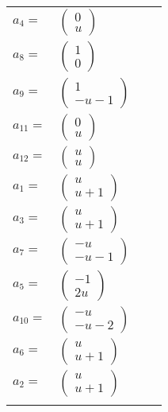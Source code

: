 \documentclass[1p]{elsarticle_modified}
\theoremstyle{definition}
\begin{document}
\begin{tabular}{m{7pt} m{180pt} m{7pt} m{180pt} }
\flushright $a_{4}=$&$\begin{pmatrix}0\\u\end{pmatrix}$ \\
\flushright $a_{8}=$&$\begin{pmatrix}1\\0\end{pmatrix}$ \\
\flushright $a_{9}=$&$\begin{pmatrix}1\\- u-1\end{pmatrix}$ \\
\flushright $a_{11}=$&$\begin{pmatrix}0\\u\end{pmatrix}$ \\
\flushright $a_{12}=$&$\begin{pmatrix}u\\u\end{pmatrix}$ \\
\flushright $a_{1}=$&$\begin{pmatrix}u\\u+1\end{pmatrix}$ \\
\flushright $a_{3}=$&$\begin{pmatrix}u\\u+1\end{pmatrix}$ \\
\flushright $a_{7}=$&$\begin{pmatrix}- u\\- u-1\end{pmatrix}$ \\
\flushright $a_{5}=$&$\begin{pmatrix}-1\\2 u\end{pmatrix}$ \\
\flushright $a_{10}=$&$\begin{pmatrix}- u\\- u-2\end{pmatrix}$ \\
\flushright $a_{6}=$&$\begin{pmatrix}u\\u+1\end{pmatrix}$ \\
\flushright $a_{2}=$&$\begin{pmatrix}u\\u+1\end{pmatrix}$\\&\end{tabular}
\end{document}
